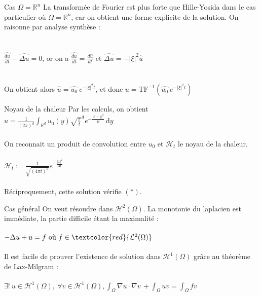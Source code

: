 \documentclass[10pt]{beamer}
\begin{document}
\begin{frame}{Cas $\Omega=\mathbb{R}^n$}
La transformée de Fourier est plus forte que Hille-Yosida dans le cas particulier où $\Omega=\mathbb{R}^n$, car on obtient une forme explicite de la solution. On raisonne par analyse synthèse : \\ ~ \\ ~ \\  
$\displaystyle \widehat{\frac{du}{dt}}-\widehat{\Delta u}=0$, or on a $\widehat{\frac{du}{dt}}=\frac{d\hat{u}}{dt}$ et $\widehat{\Delta u}=-|\xi|^2\hat{u}$ \\ ~ \\ ~ \\ 

On obtient alors $\widehat{u}=\widehat{u_0} \ e^{-|\xi|^2t}$, et donc $u=\text{TF}^{-1}(\widehat{u_0} \ e^{-|\xi|^2t})$
\end{frame}



\begin{frame}{Noyau de la chaleur}
Par les calculs, on obtient $u=\frac{1}{(2\pi)^d}  \displaystyle \int_{\mathbb{R}^d} u_0(y)\sqrt{\frac{\pi}{t}}^d e^{-\frac{|x-y|^2}{4t}} \, \mathrm{d}y $\\ ~ \\ 
On reconnait un produit de convolution entre $u_0$ et $\mathcal{H}_t$ le noyau de la chaleur. \\ ~ \\ 

$\mathcal{H}_t := \frac{1}{\sqrt{(4\pi t)^d}} e^{-\frac{|x|^2}{4t}}$ \\ ~ \\ 

Réciproquement, cette solution vérifie $(*)$.
\end{frame}


\begin{frame}{Cas général}
On veut résoudre dans $\mathcal{H}^2(\Omega)$. La monotonie du laplacien est immédiate, la partie difficile étant la maximalité : \\ ~ \\ 
$-\Delta u +u = f \ \text{où} \ f \in  \textcolor{red}{\mathcal{L}^2(\Omega)} $   \\ ~ \\ 
Il est facile de prouver l'existence de solution dans $\mathcal{H}^1(\Omega)$ grâce au théorème de Lax-Milgram :\\ ~ \\ 
$\exists !\  u\in\mathcal{H}^1(\Omega), \ \forall v \in \mathcal{H}^1(\Omega), \displaystyle \int_{\Omega} \nabla u \cdot \nabla v \,  + \int_{\Omega} u v =  \int_{\Omega} f v  \, $
\end{frame}
\end{document}
